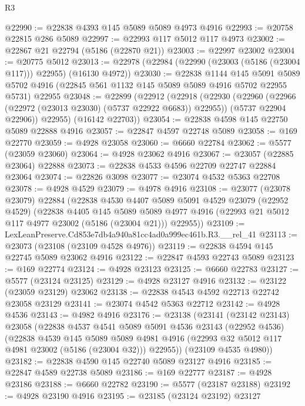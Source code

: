 \begin{lexlean}{R3}
\begin{coremodule}
@22990 := @22838 @4393 @145 @5089 @5089 @4973 @4916
@22993 := @20758 @22815 @286 @5089
@22997 := @22993 @117 @5012 @117 @4973
@23002 := @22867 @21 @22794 (@5186 (@22870 @21))
@23003 := @22997 @23002
@23004 := @20775 @5012
@23013 := @22978 (@22984 (@22990 (@23003 (@5186 (@23004 @117))) @22955) (@16130 @4972))
@23030 := @22838
    @1144
    @145
    @5091
    @5089
    @5702
    @4916
    (@22845 @561 @1132 @145 @5089 @5089 @4916 @5702 @22955 @5731)
    @22955
@23048 := @22899
    (@22912
      (@22918
        (@22930
          (@22960 (@22966 (@22972 (@23013 @23030) (@5737 @22922 @6683)) @22955))
          (@5737 @22904 @22906))
        @22955)
      (@16142 @22703))
@23054 := @22838 @4598 @145 @22750 @5089 @22888 @4916
@23057 := @22847 @4597 @22748 @5089
@23058 := @169 @22770
@23059 := @4928 @23058
@23060 := @6660 @22784
@23062 := @5577 (@23059 @23060)
@23064 := @4928 @23062 @4916
@23067 := @23057 (@22885 @23064) @22888
@23073 := @22838 @4533 @4596 @22709 @22747 @22884 @23064
@23074 := @22826 @3098
@23077 := @23074 @4532 @5363 @22708
@23078 := @4928 @4529
@23079 := @4978 @4916
@23108 := @23077
    (@23078 @23079)
    @22884
    (@22838
      @4530
      @4407
      @5089
      @5091
      @4529
      @23079
      (@22952 @4529)
      (@22838
        @4405
        @145
        @5089
        @5089
        @4977
        @4916
        (@22993 @21 @5012 @117 @4977 @23002 (@5186 (@23004 @21)))
        @22955))
@23109 := LexLeanPreserve.Cd853e7db4a940a81cc4ad0a999ec461b.R3.__rel_41
@23113 := @23073 (@23108 (@23109 @4528 @4976))
@23119 := @22838 @4594 @145 @22745 @5089 @23062 @4916
@23122 := @22847 @4593 @22743 @5089
@23123 := @169 @22774
@23124 := @4928 @23123
@23125 := @6660 @22783
@23127 := @5577 (@23124 @23125)
@23129 := @4928 @23127 @4916
@23132 := @23122 (@23059 @23129) @23062
@23138 := @22838 @4543 @4592 @22713 @22742 @23058 @23129
@23141 := @23074 @4542 @5363 @22712
@23142 := @4928 @4536
@23143 := @4982 @4916
@23176 := @23138
    (@23141
      (@23142 @23143)
      @23058
      (@22838
        @4537
        @4541
        @5089
        @5091
        @4536
        @23143
        (@22952 @4536)
        (@22838
          @4539
          @145
          @5089
          @5089
          @4981
          @4916
          (@22993 @32 @5012 @117 @4981 @23002 (@5186 (@23004 @32)))
          @22955))
      (@23109 @4535 @4980))
@23182 := @22838 @4590 @145 @22740 @5089 @23127 @4916
@23185 := @22847 @4589 @22738 @5089
@23186 := @169 @22777
@23187 := @4928 @23186
@23188 := @6660 @22782
@23190 := @5577 (@23187 @23188)
@23192 := @4928 @23190 @4916
@23195 := @23185 (@23124 @23192) @23127

\end{coremodule}
\end{lexlean}
